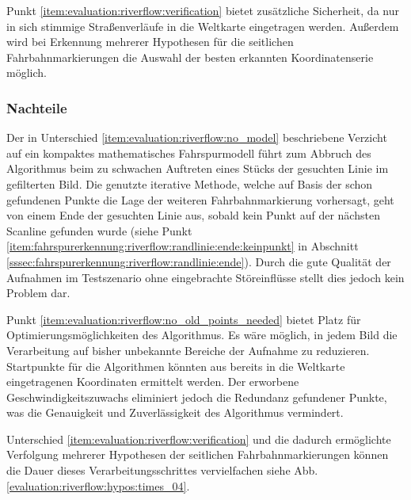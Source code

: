 Punkt \ref{item:evaluation:riverflow:verification} bietet zusätzliche Sicherheit, da nur in sich stimmige Straßenverläufe in die Weltkarte eingetragen werden. Außerdem wird bei Erkennung mehrerer Hypothesen für die seitlichen Fahrbahnmarkierungen die Auswahl der besten erkannten Koordinatenserie möglich.

\subsubsection{Nachteile}
Der in Unterschied \ref{item:evaluation:riverflow:no_model} beschriebene Verzicht auf ein kompaktes mathematisches Fahrspurmodell führt zum Abbruch des Algorithmus beim zu schwachen Auftreten eines Stücks der gesuchten Linie im gefilterten Bild. Die genutzte iterative Methode, welche auf Basis der schon gefundenen Punkte die Lage der weiteren Fahrbahnmarkierung vorhersagt, geht von einem Ende der gesuchten Linie aus, sobald kein Punkt auf der nächsten Scanline gefunden wurde (siehe Punkt \ref{item:fahrspurerkennung:riverflow:randlinie:ende:keinpunkt} in Abschnitt \ref{sssec:fahrspurerkennung:riverflow:randlinie:ende}). Durch die gute Qualität der Aufnahmen im Testszenario ohne eingebrachte Störeinflüsse stellt dies jedoch kein  Problem dar.

Punkt \ref{item:evaluation:riverflow:no_old_points_needed} bietet Platz für Optimierungsmöglichkeiten des Algorithmus. Es wäre möglich, in jedem Bild die Verarbeitung auf bisher unbekannte Bereiche der Aufnahme zu reduzieren. Startpunkte für die Algorithmen könnten aus bereits in die Weltkarte eingetragenen Koordinaten ermittelt werden. Der erworbene Geschwindigkeitszuwachs eliminiert jedoch die Redundanz gefundener Punkte, was die Genauigkeit und Zuverlässigkeit des Algorithmus vermindert.

Unterschied \ref{item:evaluation:riverflow:verification} und die dadurch ermöglichte Verfolgung mehrerer Hypothesen der seitlichen Fahrbahnmarkierungen können die Dauer dieses Verarbeitungsschrittes vervielfachen siehe Abb. \ref{evaluation:riverflow:hypos:times_04}.
